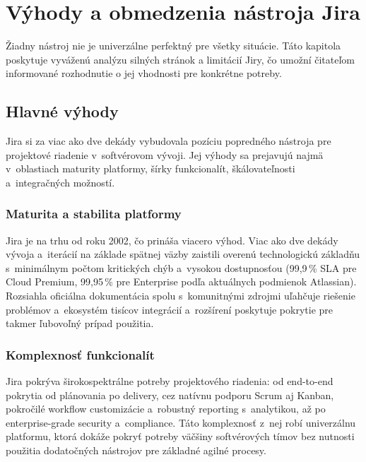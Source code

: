 
\chapter{Výhody a obmedzenia nástroja Jira}\label{ch:vyhody-nevyhody}

Žiadny nástroj nie je univerzálne perfektný pre všetky situácie. Táto kapitola poskytuje vyváženú analýzu silných stránok a limitácií Jiry, čo umožní čitateľom informované rozhodnutie o jej vhodnosti pre konkrétne potreby.

\section{Hlavné výhody}

Jira si za viac ako dve dekády vybudovala pozíciu popredného nástroja pre projektové riadenie v~softvérovom vývoji. Jej výhody sa prejavujú najmä v~oblastiach maturity platformy, šírky funkcionalít, škálovateľnosti a~integračných možností.

\subsection{Maturita a stabilita platformy}

Jira je na trhu od roku 2002, čo prináša viacero výhod. Viac ako dve dekády vývoja a~iterácií na základe spätnej väzby zaistili overenú technologickú základňu s~minimálnym počtom kritických chýb a~vysokou dostupnosťou (99,9\,\% SLA pre Cloud Premium, 99,95\,\% pre Enterprise podľa aktuálnych podmienok Atlassian). Rozsiahla oficiálna dokumentácia spolu s~komunitnými zdrojmi uľahčuje riešenie problémov a~ekosystém tisícov integrácií a~rozšírení poskytuje pokrytie pre takmer ľubovoľný prípad použitia.

\subsection{Komplexnosť funkcionalít}

Jira pokrýva širokospektrálne potreby projektového riadenia: od end-to-end pokrytia od plánovania po delivery, cez natívnu podporu Scrum aj Kanban, pokročilé workflow customizácie a~robustný reporting s~analytikou, až po enterprise-grade security a~compliance. Táto komplexnosť z~nej robí univerzálnu platformu, ktorá dokáže pokryť potreby väčšiny softvérových tímov bez nutnosti použitia dodatočných nástrojov pre základné agilné procesy.

